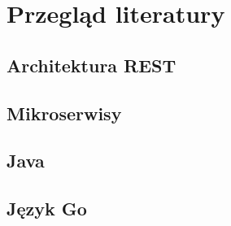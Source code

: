 \chapter{Przegląd literatury}

\section{Architektura REST}


\section{Mikroserwisy}


\section{Java}


\section{Język Go}

